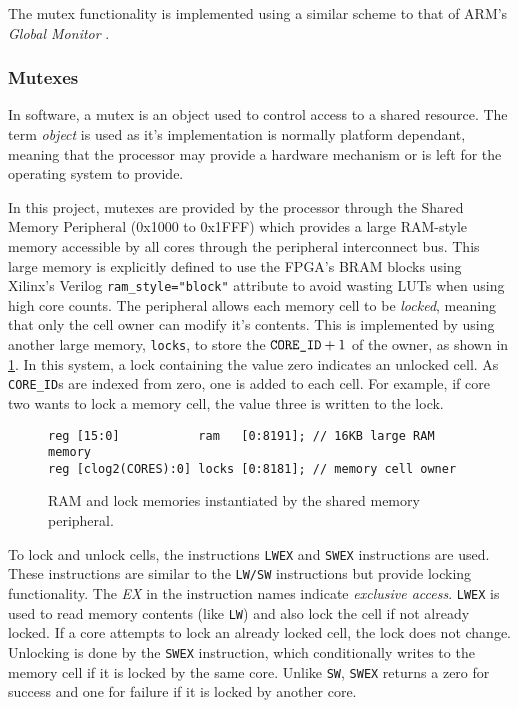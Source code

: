 The mutex functionality is implemented using a similar scheme to that of ARM's \textit{Global Monitor} \cite{armgmonitor}.

\subsubsection{Mutexes}
In software, a mutex is an object used to control access to a shared resource. The term \textit{object} is used as it's implementation is normally platform dependant, meaning that the processor may provide a hardware mechanism or is left for the operating system to provide.

In this project, mutexes are provided by the processor through the Shared Memory Peripheral (0x1000 to 0x1FFF) which provides a large RAM-style memory accessible by all cores through the peripheral interconnect bus. This large memory is explicitly defined to use the FPGA's BRAM blocks using Xilinx's Verilog \verb|ram_style="block"| attribute to avoid wasting LUTs when using high core counts. The peripheral allows each memory cell to be \textit{locked}, meaning that only the cell owner can modify it's contents. This is implemented by using another large memory, \verb|locks|, to store the $\verb|CORE_ID| + 1$ of the owner, as shown in \cref{fig:lock}. In this system, a lock containing the value zero indicates an unlocked cell. As \verb|CORE_ID|s are indexed from zero, one is added to each cell. For example, if core two wants to lock a memory cell, the value three is written to the lock.

\begin{figure}[h]
\centering
\begin{verbatim}
reg [15:0]           ram   [0:8191]; // 16KB large RAM memory
reg [clog2(CORES):0] locks [0:8181]; // memory cell owner
\end{verbatim}
\caption{RAM and lock memories instantiated by the shared memory peripheral.}
\label{fig:lock}
\end{figure}

To lock and unlock cells, the instructions \verb|LWEX| and \verb|SWEX| instructions are used. These instructions are similar to the \verb|LW/SW| instructions but provide locking functionality. The \textit{EX} in the instruction names indicate \textit{exclusive access}. \verb|LWEX| is used to read memory contents  (like \verb|LW|) and also lock the cell if not already locked. If a core attempts to lock an already locked cell, the lock does not change. Unlocking is done by the \verb|SWEX| instruction, which conditionally writes to the memory cell if it is locked by the same core. Unlike \verb|SW|, \verb|SWEX| returns a zero for success and one for failure if it is locked by another core.

